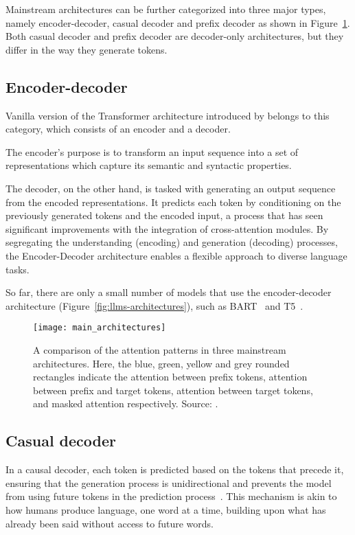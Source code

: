 Mainstream architectures can be further categorized into three major types, namely encoder-decoder, casual decoder and prefix decoder as shown in Figure~\ref{fig:architectures}.
Both casual decoder and prefix decoder are decoder-only architectures, but they differ in the way they generate tokens.

\subsection{Encoder-decoder}
\label{subsec:encoder-decoder}

Vanilla version of the Transformer architecture introduced by \textcite{vaswani2023attention} belongs to this category, which consists of an encoder and a decoder.

The encoder's purpose is to transform an input sequence into a set of representations which capture its semantic and syntactic properties.

The decoder, on the other hand, is tasked with generating an output sequence from the encoded representations.
It predicts each token by conditioning on the previously generated tokens and the encoded input, a process that has seen significant improvements with the integration of cross-attention modules.
By segregating the understanding (encoding) and generation (decoding) processes, the Encoder-Decoder architecture enables a flexible approach to diverse language tasks.

So far, there are only a small number of models that use the encoder-decoder architecture (Figure~\ref{fig:llms-architectures}), such as BART~\cite{lewis2020bart} and T5~\cite{raffel2023exploring}.

\begin{figure}[h]
	\centering
	\texttt{[image: main\_architectures]}
	\caption{A comparison of the attention patterns in three mainstream architectures. Here, the blue, green, yellow and grey rounded rectangles indicate the attention between prefix tokens, attention between prefix and target tokens, attention between target tokens, and masked attention respectively. Source: \textcite{survey}.}
	\label{fig:architectures}
\end{figure}

\subsection{Casual decoder}
\label{subsec:casual-decoder}

In a causal decoder, each token is predicted based on the tokens that precede it, ensuring that the generation process is unidirectional and prevents the model from using future tokens in the prediction process~\cite{vaswani2023attention}.
This mechanism is akin to how humans produce language, one word at a time, building upon what has already been said without access to future words.


